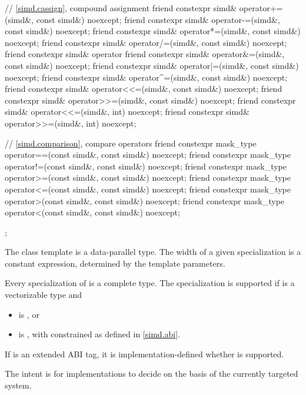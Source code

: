 \begin{codeblock}
{  // \ref{simd.cassign},  compound assignment
  friend constexpr simd& operator+=(simd&, const simd&) noexcept;
  friend constexpr simd& operator-=(simd&, const simd&) noexcept;
  friend constexpr simd& operator*=(simd&, const simd&) noexcept;
  friend constexpr simd& operator/=(simd&, const simd&) noexcept;
  friend constexpr simd& operator%
  friend constexpr simd& operator&=(simd&, const simd&) noexcept;
  friend constexpr simd& operator|=(simd&, const simd&) noexcept;
  friend constexpr simd& operator^=(simd&, const simd&) noexcept;
  friend constexpr simd& operator<<=(simd&, const simd&) noexcept;
  friend constexpr simd& operator>>=(simd&, const simd&) noexcept;
  friend constexpr simd& operator<<=(simd&, int) noexcept;
  friend constexpr simd& operator>>=(simd&, int) noexcept;

  // \ref{simd.comparison},  compare operators
  friend constexpr mask_type operator==(const simd&, const simd&) noexcept;
  friend constexpr mask_type operator!=(const simd&, const simd&) noexcept;
  friend constexpr mask_type operator>=(const simd&, const simd&) noexcept;
  friend constexpr mask_type operator<=(const simd&, const simd&) noexcept;
  friend constexpr mask_type operator>(const simd&, const simd&) noexcept;
  friend constexpr mask_type operator<(const simd&, const simd&) noexcept;
};
\end{codeblock}

\pnum
The class template  is a data-parallel type. The width of a given  specialization is a constant expression, determined by the template parameters.

\pnum
Every specialization of  is a complete type. The specialization  is supported if  is a vectorizable type and
\begin{itemize}
  \item {} is , or
  \item {} is , with  constrained as defined in \ref{simd.abi}.
\end{itemize}

If  is an extended ABI tag, it is implementation-defined whether  is supported. \begin{note}The intent is for implementations to decide on the basis of the currently targeted system.\end{note}

